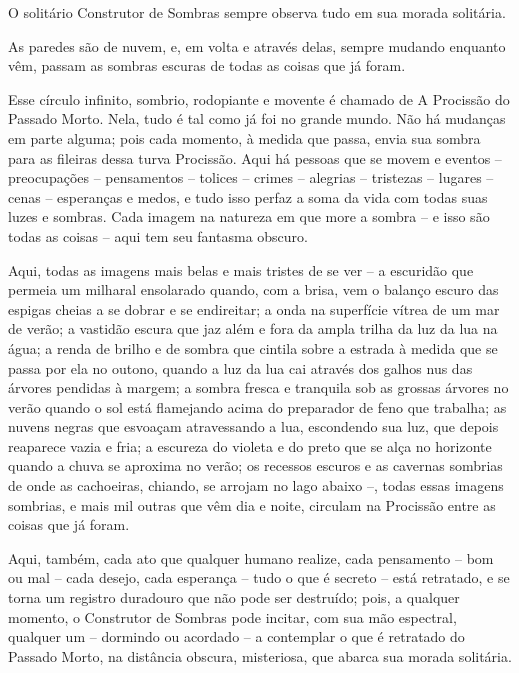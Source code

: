  

O solitário Construtor de Sombras sempre observa tudo em sua morada
solitária.

As paredes são de nuvem, e, em volta e através delas, sempre mudando
enquanto vêm, passam as sombras escuras de todas as coisas que já foram.

Esse círculo infinito, sombrio, rodopiante e movente é chamado de A
Procissão do Passado Morto. Nela, tudo é tal como já foi no grande
mundo. Não há mudanças em parte alguma; pois cada momento, à medida que
passa, envia sua sombra para as fileiras dessa turva Procissão. Aqui há
pessoas que se movem e eventos -- preocupações -- pensamentos -- tolices
-- crimes -- alegrias -- tristezas -- lugares -- cenas -- esperanças e
medos, e tudo isso perfaz a soma da vida com todas suas luzes e sombras.
Cada imagem na natureza em que more a sombra -- e isso são todas as
coisas -- aqui tem seu fantasma obscuro.

Aqui, todas as imagens mais belas e mais tristes de se ver -- a
escuridão que permeia um milharal ensolarado quando, com a brisa, vem o
balanço escuro das espigas cheias a se dobrar e se endireitar; a onda na
superfície vítrea de um mar de verão; a vastidão escura que jaz além e
fora da ampla trilha da luz da lua na água; a renda de brilho e de
sombra que cintila sobre a estrada à medida que se passa por ela no
outono, quando a luz da lua cai através dos galhos nus das árvores
pendidas à margem; a sombra fresca e tranquila sob as grossas árvores no
verão quando o sol está flamejando acima do preparador de feno que
trabalha; as nuvens negras que esvoaçam atravessando a lua, escondendo
sua luz, que depois reaparece vazia e fria; a escureza do violeta e do
preto que se alça no horizonte quando a chuva se aproxima no verão; os
recessos escuros e as cavernas sombrias de onde as cachoeiras, chiando,
se arrojam no lago abaixo --, todas essas imagens sombrias, e mais mil
outras que vêm dia e noite, circulam na Procissão entre as coisas que já
foram.

Aqui, também, cada ato que qualquer humano realize, cada pensamento --
bom ou mal -- cada desejo, cada esperança -- tudo o que é secreto --
está retratado, e se torna um registro duradouro que não pode ser
destruído; pois, a qualquer momento, o Construtor de Sombras pode
incitar, com sua mão espectral, qualquer um -- dormindo ou acordado -- a
contemplar o que é retratado do Passado Morto, na distância obscura,
misteriosa, que abarca sua morada solitária.

